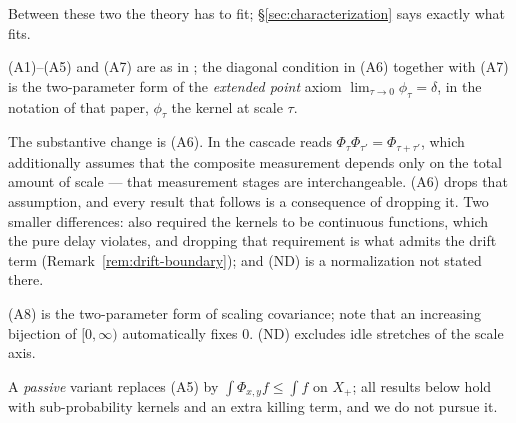 Between these two the theory has to fit; \S\ref{sec:characterization} says exactly what
fits.

\begin{remark}\label{rem:axiom-provenance}
(A1)--(A5) and (A7) are as in ; the diagonal condition in (A6)
together with (A7) is the two-parameter form of the \emph{extended point} axiom
$\lim_{\tau\to 0}\phi_\tau = \delta$, in the notation of that paper, $\phi_\tau$ the kernel
at scale $\tau$.

The substantive change is (A6). In  the cascade reads
$\Phi_\tau \Phi_{\tau'} = \Phi_{\tau + \tau'}$, which additionally assumes that the composite
measurement depends only on the total amount of scale --- that measurement stages are
interchangeable. (A6) drops that assumption, and every result that follows is a
consequence of dropping it. Two smaller differences:  also
required the kernels to be continuous functions, which the pure delay violates, and
dropping that requirement is what admits the drift term (Remark~\ref{rem:drift-boundary});
and (ND) is a normalization not stated there.

(A8) is the two-parameter form of scaling covariance; note that an increasing bijection of
$[0,\infty)$ automatically fixes $0$. (ND) excludes idle stretches of the scale axis.

A \emph{passive} variant replaces (A5) by $\int \Phi_{x,y} f \le \int f$ on $X_+$; all results
below hold with sub-probability kernels and an extra killing term, and we do not pursue it.
\end{remark}
